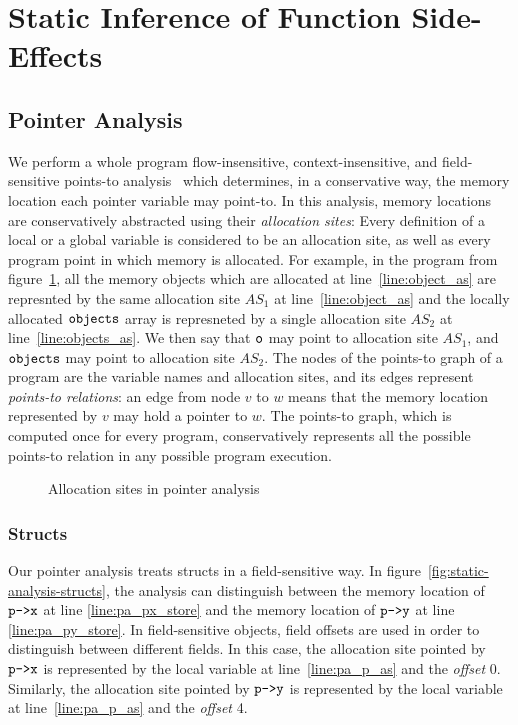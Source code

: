 
\section{Static Inference of Function Side-Effects}
\label{section:static-analysis}

\subsection{Pointer Analysis}
We perform a whole program flow-insensitive, context-insensitive, and field-sensitive
points-to analysis~\cite{Hind:Paste2001, Smaragdakis:FTPL2015} which
determines, in a conservative way, the memory location each pointer
variable may point-to. In this analysis, memory locations are
conservatively abstracted using their \emph{allocation sites}: Every
definition of a local or a global variable is considered to be an
allocation site, as well as every program point in which memory is
allocated.
For example, in the program from figure~\ref{fig:static-analysis},
all the memory objects which are allocated at line~\ref{line:object_as}
are represnted by the same allocation site $\mathit{AS_1}$ at line~\ref{line:object_as}
and the locally allocated $\texttt{objects}$ array is represneted
by a single allocation site $\mathit{AS_2}$ at line~\ref{line:objects_as}.
We then say that $\texttt{o}$ may point to allocation
site $\mathit{AS_1}$, and $\texttt{objects}$ may point to allocation site $\mathit{AS_2}$.
The nodes of the points-to graph of a
program are the variable names and allocation sites, and its edges
represent \emph{points-to relations}:
an edge from node $v$ to $w$ means that the memory location
represented by $v$ may hold a pointer to $w$.
The points-to graph, which is computed once for every program,
conservatively represents all the possible points-to relation in any
possible program execution. 

\begin{figure}
  \captionsetup[subfloat]{labelformat=empty}
  \subfloat[]{
    
  }
  \caption{Allocation sites in pointer analysis}
  \label{fig:static-analysis}
\end{figure}

\subsubsection{Structs}
Our pointer analysis treats structs in a field-sensitive way.
In figure~\ref{fig:static-analysis-structs},
the analysis can distinguish between the memory location of $\texttt{p->x}$ at line \ref{line:pa_px_store}
and the memory location of $\texttt{p->y}$ at line \ref{line:pa_py_store}.
In field-sensitive objects, field offsets are used in order to distinguish between different fields.
In this case, the allocation site pointed by $\texttt{p->x}$ is represented by
the local variable at line~\ref{line:pa_p_as} and the \textit{offset} 0.
Similarly, the allocation site pointed by $\texttt{p->y}$ is represented by
the local variable at line~\ref{line:pa_p_as} and the \textit{offset} 4.

